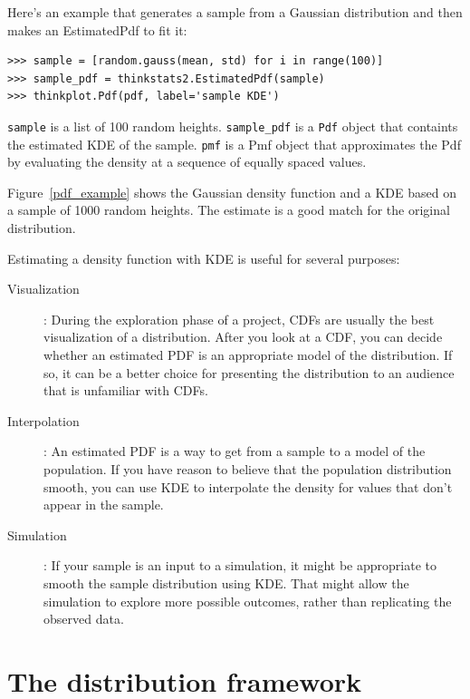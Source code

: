 \documentclass[12pt]{book}
\begin{document}
Here's an example that generates a sample from a Gaussian
distribution and then makes an EstimatedPdf to fit it:

\begin{verbatim}
>>> sample = [random.gauss(mean, std) for i in range(100)]
>>> sample_pdf = thinkstats2.EstimatedPdf(sample)
>>> thinkplot.Pdf(pdf, label='sample KDE')
\end{verbatim}

\verb"sample" is a list of 100 random heights.
\verb"sample_pdf" is a {\tt Pdf} object that containts the estimated
KDE of the sample.  {\tt pmf} is a Pmf object that approximates the Pdf by
evaluating the density at a sequence of equally spaced values.

Figure~\ref{pdf_example} shows the Gaussian density function and a KDE
based on a sample of 1000 random heights.  The estimate is a good
match for the original distribution.

Estimating a density function with KDE is useful for several purposes:

\begin{description}

\item[Visualization]: During the exploration phase of a project, CDFs
  are usually the best visualization of a distribution.  After you
  look at a CDF, you can decide whether an estimated PDF is an
  appropriate model of the distribution.  If so, it can be a better
  choice for presenting the distribution to an audience that is
  unfamiliar with CDFs.

\item[Interpolation]: An estimated PDF is a way to get from a sample
  to a model of the population.  If you have reason to believe that
  the population distribution smooth, you can use KDE to interpolate
  the density for values that don't appear in the sample.

\item[Simulation]: If your sample is an input to a simulation, it
  might be appropriate to smooth the sample distribution using KDE.
  That might allow the simulation to explore more possible outcomes,
  rather than replicating the observed data.

\end{description}


\section{The distribution framework}
\end{document}
